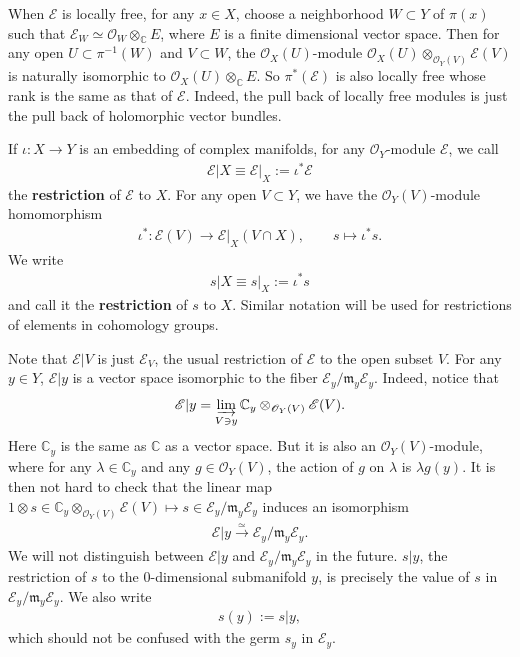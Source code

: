 \documentclass[12pt,a4paper,notitlepage]{report}
\theoremstyle{definition}
\theoremstyle{plain}
\newcommand{\fk}{\mathfrak}
\newcommand{\scr}{\mathscr}
\numberwithin{equation}{section}
\begin{document}
When $\scr E$ is locally free, for any $x\in X$, choose a neighborhood $W\subset Y$ of $\pi(x)$ such that $\scr E_W\simeq\scr O_W\otimes_{\mathbb C}E$, where $E$ is a finite dimensional vector space. Then for any open $U\subset \pi^{-1}(W)$ and $V\subset W$, the $\scr O_X(U)$-module $\scr O_X(U)\otimes_{\scr O_Y(V)}\scr E(V)$ is naturally isomorphic to $\scr O_X(U)\otimes_{\mathbb C}E$. So $\pi^*(\scr E)$ is also locally free whose rank is the same as that of $\scr E$. Indeed, the pull back of locally free modules is just the pull back of holomorphic vector bundles. 

If $\iota:X\rightarrow Y$ is an embedding of complex manifolds, for any  $\scr O_Y$-module $\scr E$, we call  
\begin{align*}
\scr E|X\equiv\scr E|_X:=\iota^*\scr E
\end{align*}
\index{EX@ $\scr E\lvert X\equiv\scr E\lvert_X,\scr E\lvert x$}the \textbf{restriction} of $\scr E$ to $X$. For any open $V\subset Y$, we have the $\scr O_Y(V)$-module homomorphism
\begin{gather*}
\iota^*:\scr E(V)\rightarrow\scr E|_X(V\cap X),\qquad s\mapsto \iota^*s.
\end{gather*}
We  write 
\begin{align*}
s|X\equiv s|_X:=\iota^*s
\end{align*}
and call it the \textbf{restriction} of $s$ to $X$. \index{EX@ ${\scr E\lvert X},\scr E\lvert x$!${s\lvert X=s\lvert_X}$} Similar notation will be used for restrictions of elements in cohomology groups.

Note that $\scr E|V$ is just $\scr E_V$,  the usual restriction of $\scr E$ to the open subset $V$.  For any $y\in Y$, $\scr E|y$ is a vector space isomorphic to the fiber $\scr E_y/\fk m_y\scr E_y$.  Indeed, notice that
\begin{align*}
\scr E|y=\varinjlim_{V\ni y}\mathbb C_y\otimes_{\scr O_Y(V)}\scr E(V).
\end{align*}
Here $\mathbb C_y$ is the same as $\mathbb C$ as a vector space. But it is also an $\scr O_Y(V)$-module, where for any $\lambda\in\mathbb C_y$ and any $g\in\scr O_Y(V)$, the action of $g$ on $\lambda$ is $\lambda g(y)$. It is then not hard to check that the linear map $1\otimes s\in\mathbb C_y\otimes_{\scr O_Y(V)}\scr E(V)\mapsto s\in\scr E_y/\fk m_y\scr E_y$ induces an isomorphism
\begin{align*}
\scr E|y\xrightarrow{\simeq}\scr E_y/\fk m_y\scr E_y.
\end{align*}
We will not distinguish between $\scr E|y$ and $\scr E_y/\fk m_y\scr E_y$ in the future. $s|y$, the restriction of $s$ to the $0$-dimensional submanifold $y$, is precisely the value of $s$ in $\scr E_y/\fk m_y\scr E_y$. We also write
\begin{align*}
s(y):=s|y,
\end{align*}
\index{EX@ ${\scr E\lvert X},\scr E\lvert x$!${s\lvert x=s(x)}$}which should not be confused with the germ $s_y$ in $\scr E_y$.
\end{document}
